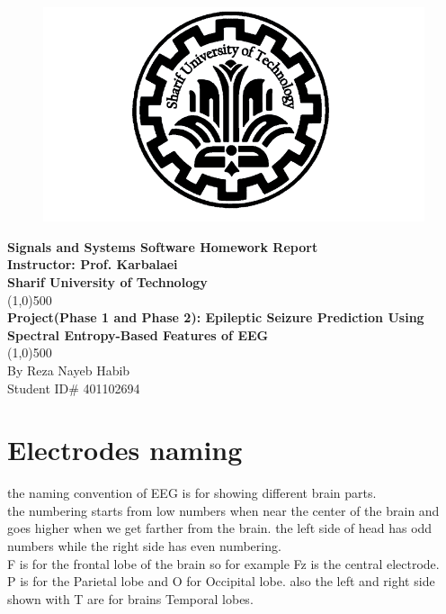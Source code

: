 \documentclass[11pt]{article}
\begin{document}
 
\begin{titlepage}
\begin{center}

\begin{figure}[H]
\begin{center}
\includegraphics[scale=0.4]{Fig/SUT.png}

\end{center}
\end{figure}

\huge{\textbf{Signals and Systems Software Homework Report}} \\ 
\vspace*{2cm}
\Large{\textbf{Instructor: Prof. Karbalaei}} \\
\vspace*{1cm}
\huge{\textbf{Sharif University of Technology}} \\
\line(1,0){500} \\ 
\Huge{\textbf{Project(Phase 1 and Phase 2): Epileptic Seizure Prediction Using 
Spectral Entropy-Based Features of EEG}} \\
\line(1,0){500} \\
\vfill
\Large{By Reza Nayeb Habib}\\
\Large{Student ID\# 401102694} \\

\end{center}
\end{titlepage}

\tableofcontents
\thispagestyle{empty}
\clearpage
\setcounter{page}{1}


\section{Electrodes naming}
the naming convention of EEG is for showing different brain parts. \\
the numbering starts from low numbers when near the center of the brain and goes
higher when we get farther from the brain. the left side of head  has odd numbers
while the right side has even numbering. \\
F is for the frontal lobe of the brain so for example Fz is the central electrode. \\
P is for the Parietal lobe and O for Occipital lobe. also the left and right side
shown with T are for brains Temporal lobes. \\
\end{document}
